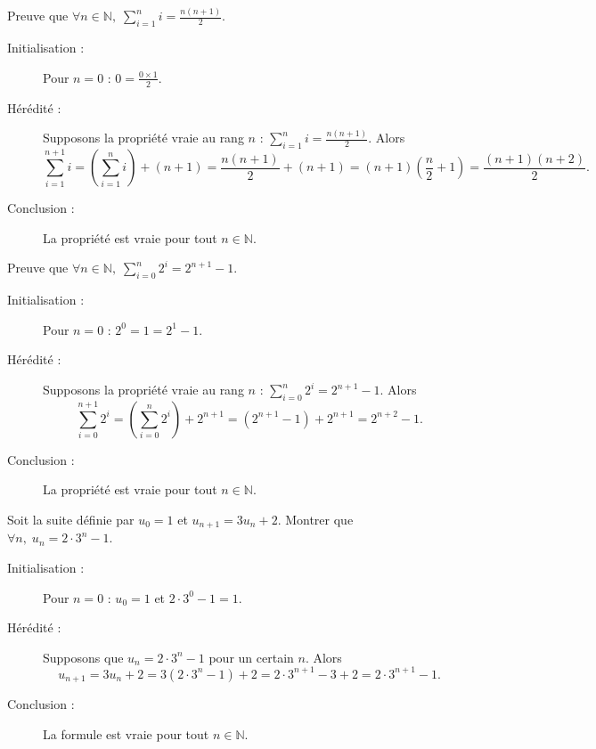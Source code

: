 \begin{corrections}
\begin{questions}
  \item Preuve que $\forall n \in \mathbb{N}, \; \sum_{i=1}^n i = \frac{n(n+1)}{2}$.
    \begin{description}
    \item[Initialisation :] Pour $n=0$ : $0 = \frac{0 \times 1}{2}$.
    \item[Hérédité :] Supposons la propriété vraie au rang $n$ : $\sum_{i=1}^n i = \frac{n(n+1)}{2}$.
      Alors
      $$
      \sum_{i=1}^{n+1} i = \left(\sum_{i=1}^n i\right) + (n+1)
      = \frac{n(n+1)}{2} + (n+1)
      = (n+1)\left(\frac{n}{2}+1\right)
      = \frac{(n+1)(n+2)}{2}.
      $$
    \item[Conclusion :] La propriété est vraie pour tout $n \in \mathbb{N}$.
    \end{description}

  \item Preuve que $\forall n \in \mathbb{N}, \; \sum_{i=0}^n 2^i = 2^{n+1} - 1$.
    \begin{description}
    \item[Initialisation :] Pour $n=0$ : $2^0 = 1 = 2^{1} - 1$.
    \item[Hérédité :] Supposons la propriété vraie au rang $n$ : $\sum_{i=0}^n 2^i = 2^{n+1} - 1$.
      Alors
      $$
      \sum_{i=0}^{n+1} 2^i = \left(\sum_{i=0}^{n} 2^i\right) + 2^{n+1}
      = (2^{n+1}-1) + 2^{n+1}
      = 2^{n+2} - 1.
      $$
    \item[Conclusion :] La propriété est vraie pour tout $n \in \mathbb{N}$.
    \end{description}

  \item Soit la suite définie par $u_0 = 1$ et $u_{n+1} = 3u_n + 2$. Montrer que $\forall n, \; u_n = 2 \cdot 3^n - 1$.
    \begin{description}
    \item[Initialisation :] Pour $n=0$ : $u_0 = 1$ et $2 \cdot 3^0 - 1 = 1$.
    \item[Hérédité :] Supposons que $u_n = 2 \cdot 3^n - 1$ pour un certain $n$. Alors
      $$
      u_{n+1} = 3u_n + 2
      = 3(2 \cdot 3^n - 1) + 2
      = 2 \cdot 3^{n+1} - 3 + 2
      = 2 \cdot 3^{n+1} - 1.
      $$
    \item[Conclusion :] La formule est vraie pour tout $n \in \mathbb{N}$.
    \end{description}

  \end{questions}

\end{corrections}

\endgroup
\endinput
